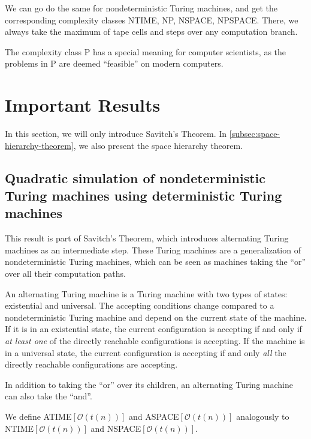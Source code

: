 We can go do the same for nondeterministic Turing machines, and get the corresponding complexity classes NTIME, NP, NSPACE, NPSPACE\@.
There, we always take the maximum of tape cells and steps over any computation branch.

The complexity class P has a special meaning for computer scientists, as the problems in P are deemed ``feasible'' on modern computers.


\section{Important Results}\label{sec:important-results}

In this section, we will only introduce Savitch's Theorem.
In \cref{subsec:space-hierarchy-theorem}, we also present the space hierarchy theorem.

\subsection{Quadratic simulation of nondeterministic Turing machines using deterministic Turing machines}\label{subsec:nspacesubsetdspacesquared}

This result is part of Savitch's Theorem, which introduces alternating Turing machines as an intermediate step.
These Turing machines are a generalization of nondeterministic Turing machines, which can be seen as machines taking the ``or'' over all their computation paths.

\begin{define}
    An alternating Turing machine is a Turing machine with two types of states: existential and universal.
    The accepting conditions change compared to a nondeterministic Turing machine and depend on the current state of the machine.
    If it is in an existential state, the current configuration is accepting if and only if \emph{at least one} of the directly reachable configurations is accepting.
    If the machine is in a universal state, the current configuration is accepting if and only \emph{all} the directly reachable configurations are accepting.
\end{define}

In addition to taking the ``or'' over its children, an alternating Turing machine can also take the ``and''.

\sloppy We define ATIME$[\mathcal{O}(t(n))]$ and ASPACE$[\mathcal{O}(t(n))]$ analogously to NTIME$[\mathcal{O}(t(n))]$ and NSPACE$[\mathcal{O}(t(n))]$.

